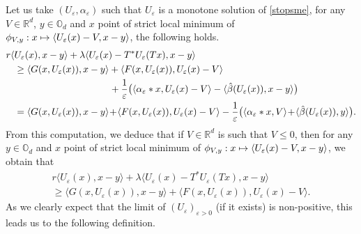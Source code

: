 \documentclass[JEP,XML,SOM,Unicode,NoEqCountersInSection,published]{cedram}
\newcommand\mto{\mathchoice{\longmapsto}{\mapsto}{\mapsto}{\mapsto}}
\let\epsilon\varepsilon
\theoremstyle{definition}
\begin{document}
Let us take $(U_{\epsilon},\alpha_{\epsilon})$ such that $U_{\epsilon}$ is a monotone solution of \eqref{stopsme}, for any $V \in \mathbb{R}^d$, $y \in \mathbb{O}_d$ and $x$ point of strict local minimum of $\phi_{V,y}: x \mto \langle U_{\epsilon}(x)-V, x-y\rangle$, the following holds.
\begin{equation*}
\begin{aligned}
r \langle &U_{\epsilon} (x), x-y \rangle+\lambda \langle U_{\epsilon}(x)-T^*U_{\epsilon}(Tx),x-y\rangle\\
&\geq\langle G(x,U_{\epsilon}(x)), x- y \rangle+\langle F(x,U_{\epsilon}(x)), U_{\epsilon}(x)-V \rangle\\
&\hspace*{3.5cm}+ \frac{1}{\epsilon}\bigl(\langle \alpha_{\epsilon}*x, U_{\epsilon}(x)-V\rangle-\langle \hat{\beta}(U_{\epsilon}(x)), x-y \rangle \bigr)\\
&= \langle G(x,U_{\epsilon}(x)), x- y \rangle\!+\!\langle F(x,U_{\epsilon}(x)), U_{\epsilon}(x)-V \rangle- \frac{1}{\epsilon}\bigl(\langle \alpha_{\epsilon}*x, V\rangle\!+\!\langle \hat{\beta}(U_{\epsilon}(x)), y \rangle \bigr).
\end{aligned}
\end{equation*}
From this computation, we deduce that if $V \in \mathbb{R}^d$ is such that $V \leq 0$, then for any $y \in \mathbb{O}_d$ and $x$ point of strict local minimum of $\phi_{V,y}: x \mto \langle U_{\epsilon}(x)-V, x-y\rangle$, we obtain that
\begin{multline}\label{remstop}
r \langle U_{\epsilon} (x), x-y \rangle+\lambda \langle U_{\epsilon}(x)-T^*U_{\epsilon}(Tx),x-y\rangle \\
\geq
\langle G(x,U_{\epsilon}(x)), x- y \rangle+\langle F(x,U_{\epsilon}(x)), U_{\epsilon}(x)-V \rangle.
\end{multline}
As we clearly expect that the limit of $(U_{\epsilon})_{\epsilon> 0} $ (if it exists) is non-positive, this leads us to the following definition.
\end{document}
